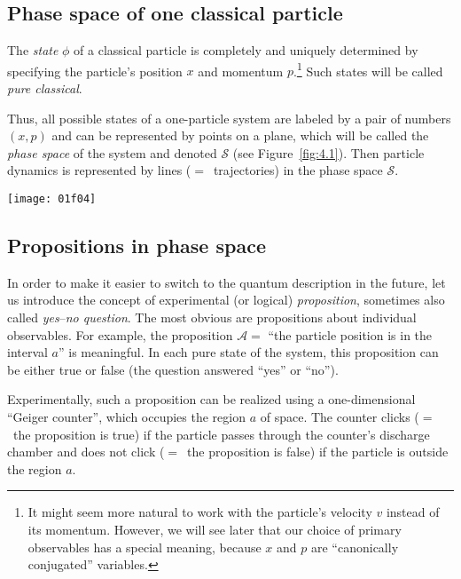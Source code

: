 \documentclass[nochecklpage]{stefan1}
\theoremstyle{definition}
\begin{document}
\subsection{Phase space of one classical particle}\label{sc:1.1.1}
The \emph{state} $\phi $
\label{lb:state}
of a classical particle is completely and uniquely determined by
specifying the particle's position $x$ and momentum $p$.\footnote{It
might seem more natural to work with the particle's velocity $v$ instead
of its momentum. However, we will see later that our choice of primary
observables has a special meaning, because $x$ and $p$ are ``canonically
conjugated'' variables.} Such states will be called \emph{pure classical}.

Thus, all possible states of a one-particle system are labeled by a pair
of numbers $(x,p)$ and can be represented by points on a plane, which
will be called the \emph{phase space} of the system and
denoted $ \mathcal{S} $ (see Figure~\ref{fig:4.1}).
\label{lb:phase-space}
Then particle dynamics is represented by lines ($=$~trajectories) in the
phase space $ \mathcal{S} $.

\begin{SCfigure}[50][h]
\texttt{[image: 01f04]}
\caption{Phase space of a particle in one spatial dimension.}
\label{fig:4.1}
\end{SCfigure}


\subsection{Propositions in phase space}\label{sc:1.2.1}
In order to make it easier to switch to the quantum description in the
future, let us introduce the concept of experimental (or logical)
\emph{proposition}, sometimes also called
\emph{yes}--\emph{no question}.\label{lb:proposition}
The most obvious are propositions about individual observables. For
example, the proposition $ \mathcal{A} = $ ``the particle position is
in the interval $a$'' is meaningful. In each pure state of the system,
this proposition can be either true or false (the question answered
``yes'' or ``no'').

Experimentally, such a proposition can be realized using a
one-dimensional ``Geiger counter'', which occupies the region $a$ of
space. The counter clicks ($=$~the proposition is true) if the particle
passes through the counter's discharge chamber and does not click ($=$~the
proposition is false) if the particle is outside the region $a$.
\end{document}
